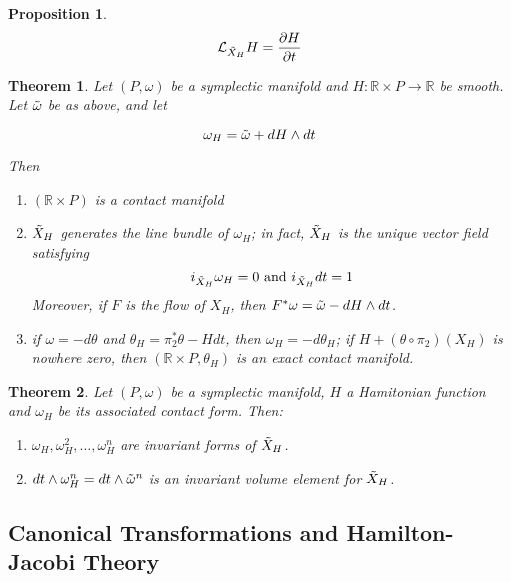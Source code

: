 \documentclass{article}
\newtheorem{thm}{Theorem}
\newtheorem{prop}{Proposition}
\begin{document}
\begin{prop}

\[
\mathcal{L}_{\Tilde{X}_H}H = \frac{\partial H}{\partial t}
\]

\end{prop}

\begin{thm}

Let $(P,\omega)$ be a symplectic manifold and $H: \mathbb{R} \times P \to \mathbb{R}$ be smooth. Let $\Tilde{\omega}$ be as above, and let 

\[\omega_H = \Tilde{\omega} + dH \wedge dt\]

Then

\begin{enumerate}
    \item $(\mathbb{R} \times P)$ is a contact manifold
    \item $\Tilde{X}_H$ generates the line bundle of $\omega_H$; in fact, $\Tilde{X}_H$ is the unique vector field satisfying
    \[    i_{\Tilde{X}_H}\omega_H = 0 \text{ and } i_{\Tilde{X}_H} dt = 1\]
    Moreover, if $F$ is the flow of $X_H$, then $F^* \omega = \Tilde{\omega} - dH \wedge dt$.
    \item if $\omega = - d \theta$ and $\theta_H = \pi_2^* \theta - H dt$, then $\omega_H=-d\theta_H$; if $H + (\theta \circ \pi_2)(X_H)$ is nowhere zero, then $(\mathbb{R} \times P, \theta_H)$ is an exact contact manifold.
\end{enumerate}
\end{thm}

\begin{thm}

Let $(P,\omega)$ be a symplectic manifold, $H$ a Hamitonian function and $\omega_H$ be its associated contact form. Then:

\begin{enumerate}
    \item $\omega_H, \omega_H^2, \ldots, \omega_H^n$ are invariant forms of $\Tilde{X}_H$.
    \item $dt \wedge \omega_H^n = dt \wedge \Tilde{\omega}^n$ is an invariant volume element for $\Tilde{X}_H$.
\end{enumerate}
\end{thm}

\subsection{Canonical Transformations and Hamilton-Jacobi Theory}
\end{document}
